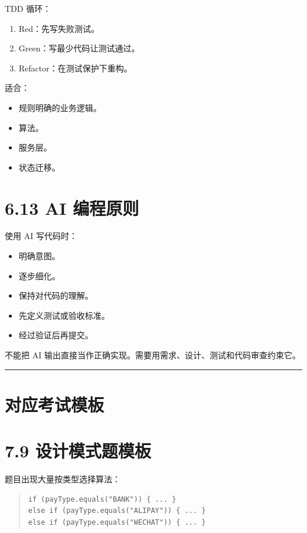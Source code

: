 \documentclass[UTF8,zihao=-4]{ctexart}
\begin{document}
TDD 循环：

\begin{enumerate}
\item Red：先写失败测试。
\item Green：写最少代码让测试通过。
\item Refactor：在测试保护下重构。
\end{enumerate}

适合：

\begin{itemize}
\item 规则明确的业务逻辑。
\item 算法。
\item 服务层。
\item 状态迁移。
\end{itemize}

\section{6.13 AI 编程原则}

使用 AI 写代码时：

\begin{itemize}
\item 明确意图。
\item 逐步细化。
\item 保持对代码的理解。
\item 先定义测试或验收标准。
\item 经过验证后再提交。
\end{itemize}

不能把 AI 输出直接当作正确实现。需要用需求、设计、测试和代码审查约束它。

\bigskip\hrule\bigskip

\section{对应考试模板}

\section{7.9 设计模式题模板}

题目出现大量按类型选择算法：

\begin{quote}
\footnotesize
\begin{verbatim}
if (payType.equals("BANK")) { ... }
else if (payType.equals("ALIPAY")) { ... }
else if (payType.equals("WECHAT")) { ... }
\end{verbatim}
\end{quote}
\end{document}

